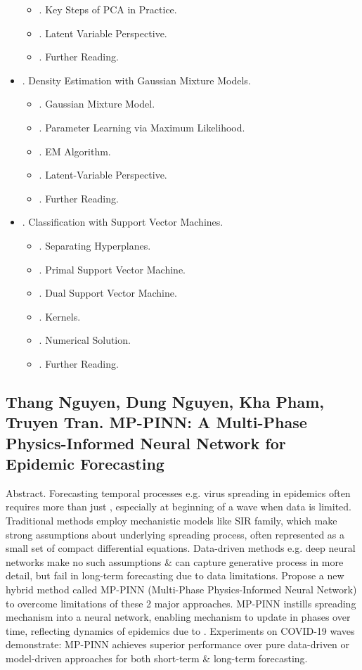 \documentclass{article}
\begin{document}
\begin{itemize}
\begin{itemize}
		\item {. Key Steps of PCA in Practice.}
		\item {. Latent Variable Perspective.}
		\item {. Further Reading.}
	\end{itemize}
	\item {. Density Estimation with Gaussian Mixture Models.}
	\begin{itemize}
		\item {. Gaussian Mixture Model.}
		\item {. Parameter Learning via Maximum Likelihood.}
		\item {. EM Algorithm.}
		\item {. Latent-Variable Perspective.}
		\item {. Further Reading.}
	\end{itemize}
	\item {. Classification with Support Vector Machines.}
	\begin{itemize}
		\item {. Separating Hyperplanes.}
		\item {. Primal Support Vector Machine.}
		\item {. Dual Support Vector Machine.}
		\item {. Kernels.}
		\item {. Numerical Solution.}
		\item {. Further Reading.}
	\end{itemize}
\end{itemize}


\subsection{{\sc Thang Nguyen, Dung Nguyen, Kha Pham, Truyen Tran}. MP-PINN: A Multi-Phase Physics-Informed Neural Network for Epidemic Forecasting}
{\sf Abstract.} Forecasting temporal processes e.g. virus spreading in epidemics often requires more than just , especially at beginning of a wave when data is limited. Traditional methods employ mechanistic models like SIR family, which make strong assumptions about underlying spreading process, often represented as a small set of compact differential equations. Data-driven methods e.g. deep neural networks make no such assumptions \& can capture generative process in more detail, but fail in long-term forecasting due to data limitations. Propose a new hybrid method called MP-PINN (Multi-Phase Physics-Informed Neural Network) to overcome limitations of these 2 major approaches. MP-PINN instills spreading mechanism into a neural network, enabling mechanism to update in phases over time, reflecting dynamics of epidemics due to . Experiments on COVID-19 waves demonstrate: MP-PINN achieves superior performance over pure data-driven or model-driven approaches for both short-term \& long-term forecasting.
\end{document}
